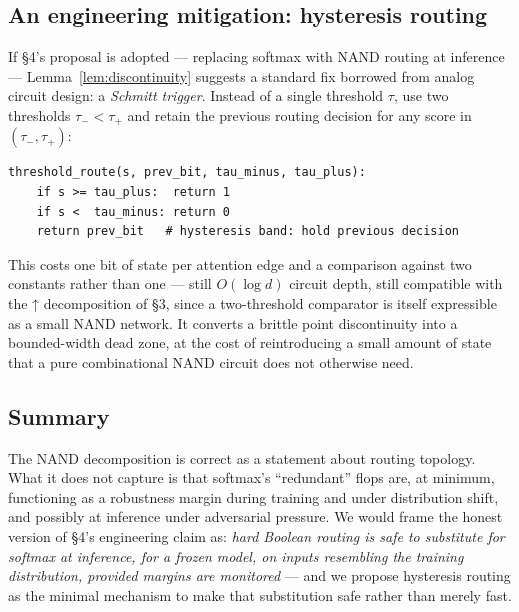 \documentclass[11pt]{article}
\theoremstyle{definition}
\newcommand{\nand}{\mathbin{\uparrow}}
\begin{document}
\subsection{An engineering mitigation: hysteresis routing}

If \S4's proposal is adopted --- replacing softmax with NAND routing at
inference --- Lemma~\ref{lem:discontinuity} suggests a standard fix borrowed
from analog circuit design: a \emph{Schmitt trigger}. Instead of a single
threshold $\tau$, use two thresholds $\tau_- < \tau_+$ and retain the
previous routing decision for any score in $(\tau_-, \tau_+)$:

\begin{lstlisting}
threshold_route(s, prev_bit, tau_minus, tau_plus):
    if s >= tau_plus:  return 1
    if s <  tau_minus: return 0
    return prev_bit   # hysteresis band: hold previous decision
\end{lstlisting}

This costs one bit of state per attention edge and a comparison against two
constants rather than one --- still $O(\log d)$ circuit depth, still
compatible with the $\nand$ decomposition of \S3, since a two-threshold
comparator is itself expressible as a small NAND network. It converts a
brittle point discontinuity into a bounded-width dead zone, at the cost of
reintroducing a small amount of state that a pure combinational NAND circuit
does not otherwise need.

\subsection{Summary}

The NAND decomposition is correct as a statement about routing topology.
What it does not capture is that softmax's ``redundant'' flops are, at
minimum, functioning as a robustness margin during training and under
distribution shift, and possibly at inference under adversarial pressure.
We would frame the honest version of \S4's engineering claim as: \emph{hard
Boolean routing is safe to substitute for softmax at inference, for a
frozen model, on inputs resembling the training distribution, provided
margins are monitored} --- and we propose hysteresis routing as the
minimal mechanism to make that substitution safe rather than merely fast.

\end{document}

